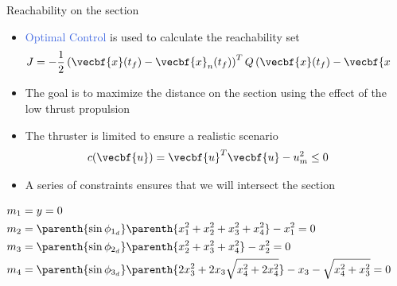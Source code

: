 \documentclass[final, usenames, dvipsnames]{beamer}
\newlength{\onecolwidth}
\newlength{\twocolwidth}
\def\Emph{\textcolor{RoyalBlue}}
\begin{document}
\begin{frame}[t]
\begin{columns}[T,onlytextwidth]
\begin{column}{\twocolwidth}
\begin{block}{Reachability on the \Poincare section}
    \begin{minipage}{0.5\columnwidth}
    \begin{itemize}
        \item \Emph{Optimal Control} is used to calculate the reachability set
            \[
            J = -\frac{1}{2} \left( \vecbf{x}(t_f) - \vecbf{x}_{n}(t_f)\right)^T Q \left( \vecbf{x}(t_f) - \vecbf{x}_{n}(t_f)\right) 
            \]
        \item The goal is to maximize the distance on the \Poincare section using the effect of the low thrust propulsion
        \item The thruster is limited to ensure a realistic scenario
        \[
            c(\vecbf{u}) = \vecbf{u}^T \vecbf{u} - u_m^2 \leq 0 
        \]
    \end{itemize}
    
    \end{minipage}%
    \begin{minipage}{0.5\columnwidth}
        \begin{itemize}
            \item A series of constraints ensures that we will intersect the \Poincare section
        \end{itemize}
                \begin{align*}\label{eq:terminal_constraints}
            \begin{split}
                m_1 &= y = 0  \\
                m_2 &= \parenth{\sin \phi_{1_{d}}} \parenth{ x_1^2 + x_2^2 + x_3^2 + x_4^2} - x_1^2 = 0 \\
                m_3 &= \parenth{\sin \phi_{2_{d}}} \parenth{ x_2^2 + x_3^2 + x_4^2} - x_2^2 = 0\\
                m_4 &= \parenth{\sin \phi_{3_{d}}} \parenth{ 2 x_3^2 + 2 x_3 \sqrt{x_4^2 + 2 x_4^2}} - x_3 - \sqrt{x_4^2 + x_3^2} = 0 
            \end{split}
        \end{align*}

    \end{minipage}
\end{block} %
\end{column}


\begin{column}{\onecolwidth} %


\end{column}
\end{columns}
\end{frame}
\end{document}
